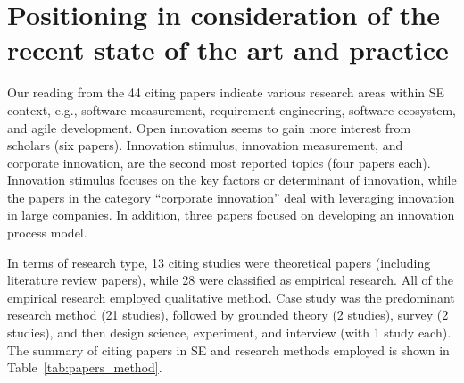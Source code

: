 \documentclass[sigconf,review]{acmart}
\begin{document}
\section{Positioning in consideration of the recent state of the art and practice}\label{sec:soa} %
Our reading from the 44 citing papers indicate various research areas within SE context, e.g., software measurement, requirement engineering, software ecosystem, and agile development. Open innovation seems to gain more interest from scholars (six papers). %
Innovation stimulus, innovation measurement, and corporate innovation, are the second most reported topics (four papers each). Innovation stimulus focuses on the key factors or determinant of innovation, while the papers in the category ``corporate innovation'' deal with leveraging innovation in large companies. In addition, three papers focused on developing an innovation process model.

In terms of research type, 13 citing studies were theoretical papers (including literature review papers), while 28 were classified as empirical research. All of the empirical research employed qualitative method. Case study was the predominant research method (21 studies), followed by grounded theory (2 studies), survey (2 studies), and then design science, experiment, and interview (with 1 study each). The summary of citing papers in SE and research methods employed is shown in Table~\ref{tab:papers_method}.
\end{document}
